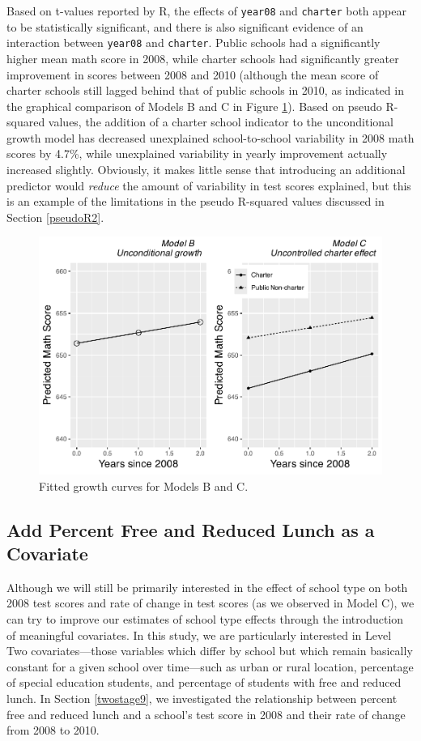 \documentclass[
]{krantz}
\begin{document}
Based on t-values reported by R, the effects of \texttt{year08} and \texttt{charter} both appear to be statistically significant, and there is also significant evidence of an interaction between \texttt{year08} and \texttt{charter}. Public schools had a significantly higher mean math score in 2008, while charter schools had significantly greater improvement in scores between 2008 and 2010 (although the mean score of charter schools still lagged behind that of public schools in 2010, as indicated in the graphical comparison of Models B and C in Figure \ref{fig:lon-scat4}). Based on pseudo R-squared values, the addition of a charter school indicator to the unconditional growth model has decreased unexplained school-to-school variability in 2008 math scores by 4.7\%, while unexplained variability in yearly improvement actually increased slightly. Obviously, it makes little sense that introducing an additional predictor would \emph{reduce} the amount of variability in test scores explained, but this is an example of the limitations in the pseudo R-squared values discussed in Section \ref{pseudoR2}.

\begin{figure}

{\centering \includegraphics[width=0.6\linewidth]{bookdown-BeyondMLR_files/figure-latex/lon-scat4-1} 

}

\caption{ Fitted growth curves for Models B and C.}\label{fig:lon-scat4}
\end{figure}

\subsection{Add Percent Free and Reduced Lunch as a Covariate}\label{modeld}

Although we will still be primarily interested in the effect of school type on both 2008 test scores and rate of change in test scores (as we observed in Model C), we can try to improve our estimates of school type effects through the introduction of meaningful covariates. In this study, we are particularly interested in Level Two covariates---those variables which differ by school but which remain basically constant for a given school over time---such as urban or rural location, percentage of special education students, and percentage of students with free and reduced lunch. In Section \ref{twostage9}, we investigated the relationship between percent free and reduced lunch and a school's test score in 2008 and their rate of change from 2008 to 2010.
\end{document}
